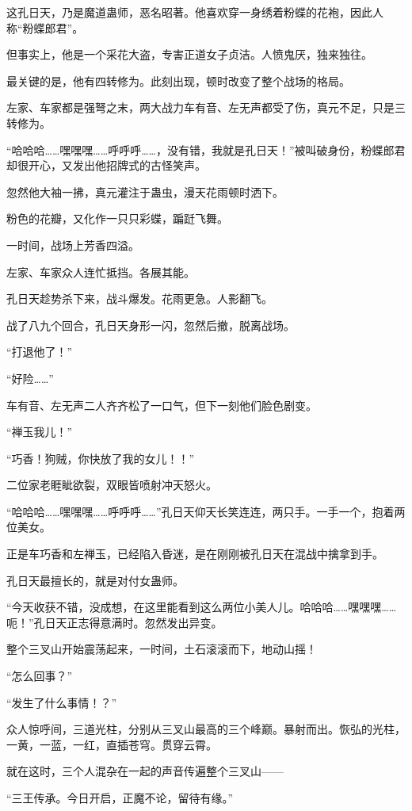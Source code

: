 \begin{this_body}
这孔日天，乃是魔道蛊师，恶名昭著。他喜欢穿一身绣着粉蝶的花袍，因此人称“粉蝶郎君”。

但事实上，他是一个采花大盗，专害正道女子贞洁。人愤鬼厌，独来独往。

最关键的是，他有四转修为。此刻出现，顿时改变了整个战场的格局。

左家、车家都是强弩之末，两大战力车有音、左无声都受了伤，真元不足，只是三转修为。

“哈哈哈……嘿嘿嘿……呼呼呼……，没有错，我就是孔日天！”被叫破身份，粉蝶郎君却很开心，又发出他招牌式的古怪笑声。

忽然他大袖一拂，真元灌注于蛊虫，漫天花雨顿时洒下。

粉色的花瓣，又化作一只只彩蝶，蹁跹飞舞。

一时间，战场上芳香四溢。

左家、车家众人连忙抵挡。各展其能。

孔日天趁势杀下来，战斗爆发。花雨更急。人影翻飞。

战了八九个回合，孔日天身形一闪，忽然后撤，脱离战场。

“打退他了！”

“好险……”

车有音、左无声二人齐齐松了一口气，但下一刻他们脸色剧变。

“禅玉我儿！”

“巧香！狗贼，你快放了我的女儿！！”

二位家老睚眦欲裂，双眼皆喷射冲天怒火。

“哈哈哈……嘿嘿嘿……呼呼呼……”孔日天仰天长笑连连，两只手。一手一个，抱着两位美女。

正是车巧香和左禅玉，已经陷入昏迷，是在刚刚被孔日天在混战中擒拿到手。

孔日天最擅长的，就是对付女蛊师。

“今天收获不错，没成想，在这里能看到这么两位小美人儿。哈哈哈……嘿嘿嘿……呃！”孔日天正志得意满时。忽然发出异变。

整个三叉山开始震荡起来，一时间，土石滚滚而下，地动山摇！

“怎么回事？”

“发生了什么事情！？”

众人惊呼间，三道光柱，分别从三叉山最高的三个峰巅。暴射而出。恢弘的光柱，一黄，一蓝，一红，直插苍穹。贯穿云霄。

就在这时，三个人混杂在一起的声音传遍整个三叉山——

“三王传承。今日开启，正魔不论，留待有缘。”


\end{this_body}
